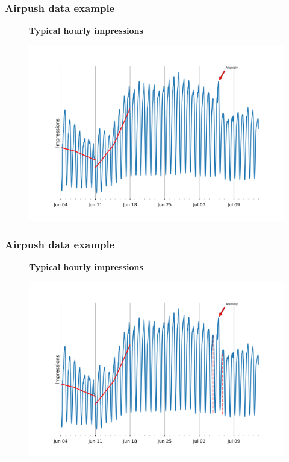 \documentclass[intlimits, 9pt, unicode]{beamer}
\begin{document}
\begin{frame}
\frametitle{Airpush data example}
\begin{figure}
\textbf{Typical hourly impressions}\par\medskip
\includegraphics[scale=0.30]{images/examples_month_3}
\end{figure}
\end{frame}

\begin{frame}
\frametitle{Airpush data example}
\begin{figure}
\textbf{Typical hourly impressions}\par\medskip
\includegraphics[scale=0.30]{images/examples_month_4}
\end{figure}
\end{frame}
\end{document}
